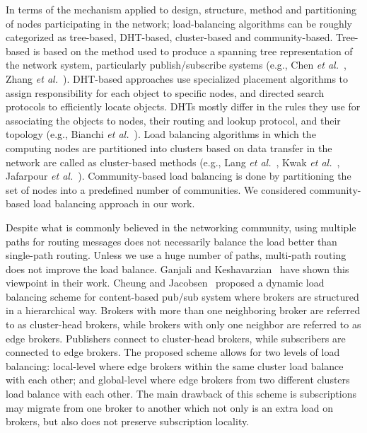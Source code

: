 In terms of the mechanism applied to design, structure, method and partitioning of nodes participating in the network; load-balancing algorithms can be roughly categorized as tree-based, DHT-based, cluster-based and community-based. Tree-based is based on the method used to produce a spanning tree representation of the network system, particularly publish/subscribe systems (e.g., Chen {\it et al.}~\cite{HChen2010}, Zhang {\it et al.}~\cite{HZhang2008}). DHT-based approaches use specialized placement algorithms to assign responsibility for each object to specific nodes, and directed search protocols to efficiently locate objects. DHTs mostly differ in the rules they use for associating the objects to nodes, their routing and lookup protocol, and their topology (e.g., Bianchi {\it et al.}~\cite{SBianchi2006}). Load balancing algorithms in which the computing nodes are partitioned into clusters based on data transfer in the network are called as cluster-based methods (e.g., Lang {\it et al.}~\cite{WLang2010}, Kwak {\it et al.}~\cite{KKwak2009}, Jafarpour {\it et al.}~\cite{HJafarpour2009}). Community-based load balancing is done by partitioning the set of nodes into a predefined number of communities. We considered community-based load balancing approach in our work.

Despite what is commonly believed in the networking community, using multiple paths for routing messages does not necessarily balance the load better than single-path routing. Unless we use a huge number of paths, multi-path routing does not improve the load balance. Ganjali and Keshavarzian~\cite{YGanjali2004} have shown this viewpoint in their work. Cheung and Jacobsen~\cite{AKYCheung2010} proposed a dynamic load balancing scheme for content-based pub/sub system where brokers are structured in a hierarchical way. Brokers with more than one neighboring broker are referred to as cluster-head brokers, while brokers with only one neighbor are referred to as edge brokers. Publishers connect to cluster-head brokers, while subscribers are connected to edge brokers. The proposed scheme allows for two levels of load balancing: local-level where edge brokers within the same cluster load balance with each other; and global-level where edge brokers from two different clusters load balance with each other. The main drawback of this scheme is subscriptions may migrate from one broker to another which not only is an extra load on brokers, but also does not preserve subscription locality.

